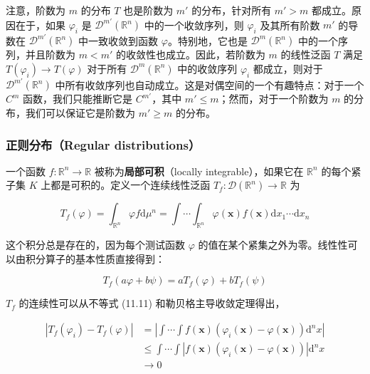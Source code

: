 注意，阶数为 \(m\) 的分布 \(T\) 也是阶数为 \(m\prime\) 的分布，针对所有
\(m\prime > m\) 都成立。原因在于，如果 \(\varphi_{i}\) 是
\(\mathcal{D}^{m\prime}\left( \mathbb{R}^{n} \right)\)
中的一个收敛序列，则 \(\varphi_{i}\) 及其所有阶数 \(m\prime\) 的导数在
\(\mathcal{D}^{m\prime}\left( \mathbb{R}^{n} \right)\) 中一致收敛到函数
\(\varphi\)。特别地，它也是
\(\mathcal{D}^{m}\left( \mathbb{R}^{n} \right)\)
中的一个序列，并且阶数为 \(m < m\prime\) 的收敛性也成立。因此，若阶数为
\(m\) 的线性泛函 \(T\) 满足
\(T\left( \varphi_{i} \right) \rightarrow T(\varphi)\) 对于所有
\(\mathcal{D}^{m}\left( \mathbb{R}^{n} \right)\) 中的收敛序列
\(\varphi_{i}\) 都成立，则对于
\(\mathcal{D}^{m\prime}\left( \mathbb{R}^{n} \right)\)
中所有收敛序列也自动成立。这是对偶空间的一个有趣特点：对于一个 \(C^{m}\)
函数，我们只能推断它是 \(C^{m\prime}\)，其中
\(m\prime \leq m\)；然而，对于一个阶数为 \(m\)
的分布，我们可以保证它是阶数为 \(m\prime \geq m\) 的分布。

\subsubsection{正则分布（Regular
distributions）}\label{ux6b63ux5219ux5206ux5e03regular-distributions}

一个函数 \(f:\mathbb{R}^{n} \rightarrow \mathbb{R}\)
被称为\textbf{局部可积}（locally integrable），如果它在
\(\mathbb{R}^{n}\) 的每个紧子集 \(K\) 上都是可积的。定义一个连续线性泛函
\(T_{f}:\mathcal{D}\left( \mathbb{R}^{n} \right) \rightarrow \mathbb{R}\)
为

\[T_{f}(\varphi) = \int_{\mathbb{R}^{n}}\varphi f\mathrm{d}\mu^{n} = \int\cdots\int_{\mathbb{R}^{n}}\varphi\left( \mathbf{x} \right)f\left( \mathbf{x} \right)\mathrm{d}x_{1}\cdots\mathrm{d}x_{n}\]

这个积分总是存在的，因为每个测试函数 \(\varphi\)
的值在某个紧集之外为零。线性性可以由积分算子的基本性质直接得到：

\[T_{f}(a\varphi + b\psi) = aT_{f}(\varphi) + bT_{f}(\psi)\]

\(T_{f}\) 的连续性可以从不等式 (11.11) 和勒贝格主导收敛定理得出，

\[\begin{aligned}
\left| T_{f}\left( \varphi_{i} \right) - T_{f}(\varphi) \right| & = \left| \int\cdots\int f\left( \mathbf{x} \right)\left( \varphi_{i}\left( \mathbf{x} \right) - \varphi\left( \mathbf{x} \right) \right)\mathrm{d}^{n}x \right| \\
 & \leq \int\cdots\int\left| f\left( \mathbf{x} \right)\left( \varphi_{i}\left( \mathbf{x} \right) - \varphi\left( \mathbf{x} \right) \right) \right|\mathrm{d}^{n}x \\
 & \rightarrow 0
\end{aligned}\]

